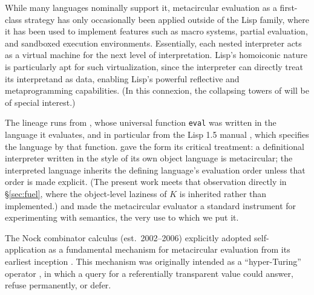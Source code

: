 \documentclass[review]{jfp-epi}
\begin{document}
While many languages nominally support it, metacircular evaluation as a
first-class strategy has only occasionally been applied outside
of the Lisp family, where it has been used to implement
features such as macro systems, partial evaluation, and sandboxed
execution environments.  Essentially, each nested interpreter acts as a
virtual machine for the next level of interpretation.  Lisp's
homoiconic nature is particularly apt for such virtualization, since the
interpreter can directly treat its interpretand as data, enabling
Lisp's powerful reflective and metaprogramming capabilities.  (In this
connexion, the collapsing towers of \citet{AminRompf2018} will be of
special interest.)

The lineage runs from \citet{McCarthy1960}, whose universal function
\texttt{eval} was written in the language it evaluates, and in
particular from the Lisp 1.5 manual \citep{Lisp15}, which specifies the
language by that function.  \citet{Reynolds1972} gave the form its
critical treatment:  a definitional interpreter written in the style of
its own object language is metacircular; the interpreted language
inherits the defining language's evaluation order unless that order is
made explicit.  (The present work meets that observation directly in
\S\ref{sec:fuel}, where the object-level laziness of $K$ is
inherited rather than implemented.)  \citet{SteeleSussman1978} and
\citet{SICP} made the metacircular evaluator a standard instrument for
experimenting with semantics, the very use to which we put it.

The Nock combinator calculus (est.\ 2002--2006) explicitly adopted
self-application as a fundamental mechanism for metacircular evaluation
from its earliest inception \citep{Nock4K}.  This mechanism was
originally intended as a ``hyper-Turing'' operator \citep{Davis2025},
in which a query for a referentially transparent value could answer,
refuse permanently, or defer.
\end{document}
